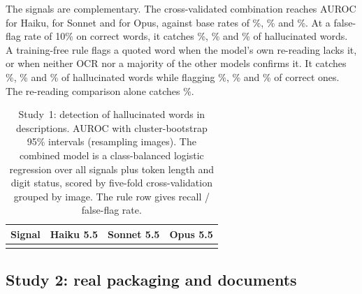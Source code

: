 The signals are complementary. The cross-validated combination reaches AUROC \AucCombCIHaiku{} for Haiku, \AucCombCISonnet{} for Sonnet and \AucCombCIOpus{} for Opus, against base rates of \BaseHaiku\%, \BaseSonnet\% and \BaseOpus\%. At a false-flag rate of 10\% on correct words, it catches \RecTenHaiku\%, \RecTenSonnet\% and \RecTenOpus\% of hallucinated words. A training-free rule flags a quoted word when the model's own re-reading lacks it, or when neither OCR nor a majority of the other models confirms it. It catches \RuleRecHaiku\%, \RuleRecSonnet\% and \RuleRecOpus\% of hallucinated words while flagging \RuleFfHaiku\%, \RuleFfSonnet\% and \RuleFfOpus\% of correct ones. The re-reading comparison alone catches \RangeRereadRec\%.

\begin{table}[!tbp]
\caption{Study~1: detection of hallucinated words in descriptions. AUROC with cluster-bootstrap 95\% intervals (resampling images). The combined model is a class-balanced logistic regression over all signals plus token length and digit status, scored by five-fold cross-validation grouped by image. The rule row gives recall / false-flag rate.}\label{tab:detect}
\footnotesize
\begin{tabular*}{\textwidth}{@{\extracolsep\fill}lccc}
\toprule
Signal & Haiku 5.5 & Sonnet 5.5 & Opus 5.5 \\
\midrule
\botrule
\end{tabular*}
\end{table}

\subsection{Study 2: real packaging and documents}\label{sec:real}


